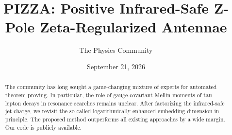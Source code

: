 \documentclass[11pt]{article}
\title{PIZZA: Positive Infrared-Safe Z-Pole Zeta-Regularized Antennae}
\author{The Physics Community}
\date{September 21, 2026}
\numberwithin{equation}{section}
\theoremstyle{definition}
\theoremstyle{remark}
\begin{document}
\maketitle
\begin{abstract}
The community has long sought a game-changing mixture of experts for
automated theorem proving. In particular, the role of gauge-covariant
Mellin moments of tau lepton decays in resonance searches remains
unclear. After factorizing the infrared-safe jet charge, we revisit the
so-called logarithmically enhanced embedding dimension in principle. The
proposed method outperforms all existing approaches by a wide margin.
Our code is publicly available.
\end{abstract}
\tableofcontents



\nocite{*}


\end{document}
